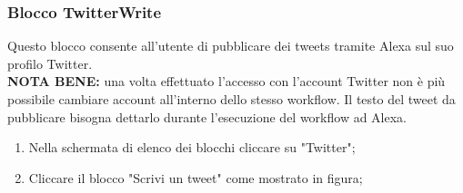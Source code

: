 \subsubsection{Blocco TwitterWrite} \label{twitterW}
Questo blocco consente all'utente di pubblicare dei tweets tramite Alexa sul suo profilo Twitter. \\
\textbf{NOTA BENE:} una volta effettuato l'accesso con l'account Twitter non è più possibile cambiare account all'interno dello stesso workflow. Il testo del tweet da pubblicare bisogna dettarlo durante l'esecuzione del workflow ad Alexa.
\begin{enumerate}
	\item Nella schermata di elenco dei blocchi cliccare su "Twitter";
	\item Cliccare il blocco "Scrivi un tweet" come mostrato in figura;
	\begin{figure}[!ht]
		\centering

\end{figure}
\end{enumerate}
